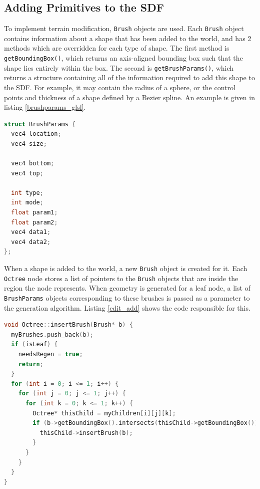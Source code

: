 \documentclass[11pt]{article}
\begin{document}
\subsection{Adding Primitives to the SDF}
\label{section:modification_implementation}
To implement terrain modification, \texttt{Brush} objects are used. Each \texttt{Brush} object contains information about a shape that has been added to the world, and has 2 methods which are overridden for each type of shape. The first method is \texttt{getBoundingBox()}, which returns an axis-aligned bounding box such that the shape lies entirely within the box. The second is \texttt{getBrushParams()}, which returns a structure containing all of the information required to add this shape to the SDF. For example, it may contain the radius of a sphere, or the control points and thickness of a shape defined by a Bezier spline. An example is given in listing \ref{brushparams_glsl}.
\begin{lstlisting}[language=C++,label={brushparams_glsl},caption={The \texttt{BrushParams} data structure. Common to all shapes are the values \texttt{bottom} and \texttt{top}, which correspond to diagonally opposite corners of the bounding box, \texttt{type}, a constant corresponding to the type of shape represented, and \texttt{mode}, a constant describing whether the shape should be added or subtracted from the SDF. The other values may be used however they are needed, but typically the \texttt{location} and \texttt{size} variables represent the location and size of the shape to be added.}]
struct BrushParams {
  vec4 location;
  vec4 size;

  vec4 bottom;
  vec4 top;

  int type;
  int mode;
  float param1;
  float param2;
  vec4 data1;
  vec4 data2;
};
\end{lstlisting}
When a shape is added to the world, a new \texttt{Brush} object is created for it. Each \texttt{Octree} node stores a list of pointers to the \texttt{Brush} objects that are inside the region the node represents. When geometry is generated for a leaf node, a list of \texttt{BrushParams} objects corresponding to these brushes is passed as a parameter to the generation algorithm. Listing \ref{edit_add} shows the code responsible for this.

\begin{lstlisting}[language=C++,label={edit_add},caption={Code to add a new brush into the octree. The brush is added recursively to lists at all levels, so each leaf has a list of exactly the brushes that are partially inside it. The flag \texttt{needsRegen} indicates that the geometry within the chunk has changed.}]
void Octree::insertBrush(Brush* b) {
  myBrushes.push_back(b);
  if (isLeaf) {
    needsRegen = true;
    return;
  }
  for (int i = 0; i <= 1; i++) {
    for (int j = 0; j <= 1; j++) {
      for (int k = 0; k <= 1; k++) {
        Octree* thisChild = myChildren[i][j][k];
        if (b->getBoundingBox().intersects(thisChild->getBoundingBox())) {
          thisChild->insertBrush(b);
        }
      }
    }
  }
}
\end{lstlisting}
\end{document}
